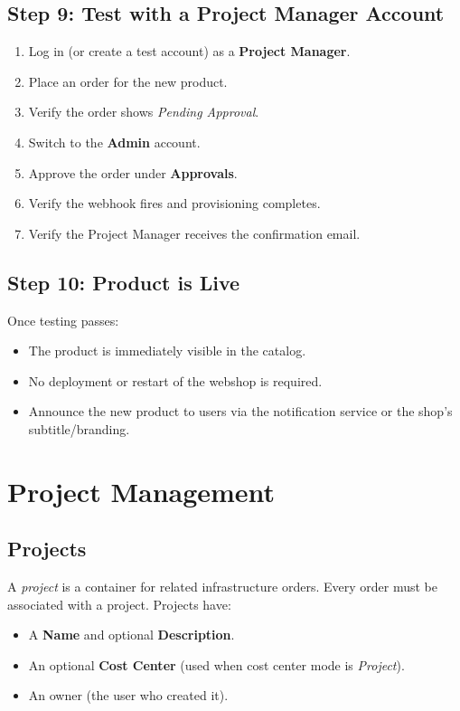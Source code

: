 \documentclass[12pt,a4paper,twoside]{report}
\newcommand{\term}[1]{\textit{#1}}
\newcommand{\role}[1]{\textsf{\textbf{#1}}}
\begin{document}
\section{Step 9: Test with a Project Manager Account}

\begin{enumerate}
  \item Log in (or create a test account) as a \role{Project Manager}.
  \item Place an order for the new product.
  \item Verify the order shows \textit{Pending Approval}.
  \item Switch to the \role{Admin} account.
  \item Approve the order under \textbf{Approvals}.
  \item Verify the webhook fires and provisioning completes.
  \item Verify the Project Manager receives the confirmation email.
\end{enumerate}

\section{Step 10: Product is Live}

Once testing passes:
\begin{itemize}
  \item The product is immediately visible in the catalog.
  \item No deployment or restart of the webshop is required.
  \item Announce the new product to users via the notification service
        or the shop's subtitle/branding.
\end{itemize}

\chapter{Project Management}
\label{ch:projects}

\section{Projects}

A \term{project} is a container for related infrastructure orders. Every
order must be associated with a project. Projects have:
\begin{itemize}
  \item A \textbf{Name} and optional \textbf{Description}.
  \item An optional \textbf{Cost Center} (used when cost center mode
        is \textit{Project}).
  \item An owner (the user who created it).
\end{itemize}
\end{document}
